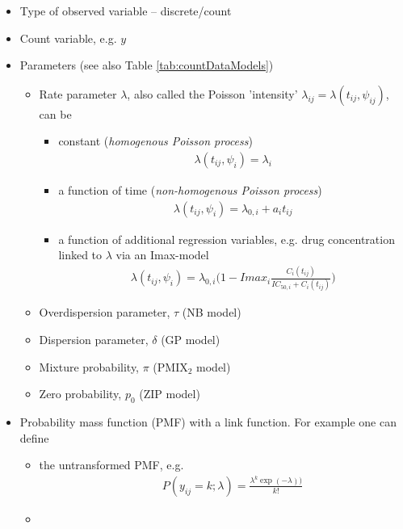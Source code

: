 \begin{itemize}
\item
Type of observed variable -- discrete/count
\item
Count variable, e.g. $y$
\item
Parameters (see also Table \ref{tab:countDataModels})
\begin{itemize}
\item
Rate parameter $\lambda$, also called the Poisson 'intensity' $\lambda_{ij} = \lambda(t_{ij}, \psi_{ij})$, can be
\begin{itemize} %
\item
constant (\emph{homogenous Poisson process})
\begin{eqnarray}
\lambda(t_{ij}, \psi_{i}) = \lambda_{i} \nonumber
\end{eqnarray}
\item
a function of time (\emph{non-homogenous Poisson process})
\begin{eqnarray}
\lambda(t_{ij}, \psi_{i}) = \lambda_{0,i} + a_i t_{ij} \nonumber
\end{eqnarray}
\item
a function of additional regression variables, e.g. drug concentration linked to $\lambda$ via an Imax-model
\begin{eqnarray}
\lambda(t_{ij}, \psi_{i}) = \lambda_{0,i} \Big(1 - Imax_i \frac{C_i(t_{ij})}{IC_{50,i} + C_i(t_{ij})} \Big) \nonumber
\end{eqnarray}
\end{itemize}
\item
Overdispersion parameter, $\tau$ (NB model) %
\item
Dispersion parameter, $\delta$ (GP model) %
\item
Mixture probability, $\pi$ (PMIX$_2$ model) %
\item
Zero probability, $p_0$ (ZIP model) %
\end{itemize}
\item
Probability mass function (PMF) with a link function. 
For example one can define 
\begin{itemize}
\item
the untransformed PMF, e.g.
\begin{eqnarray}
&& P(y_{ij}=k; \lambda) = \frac{\lambda^k \exp(-\lambda))}{k!} \nonumber
 \end{eqnarray}
\item

\end{itemize}
\end{itemize}
